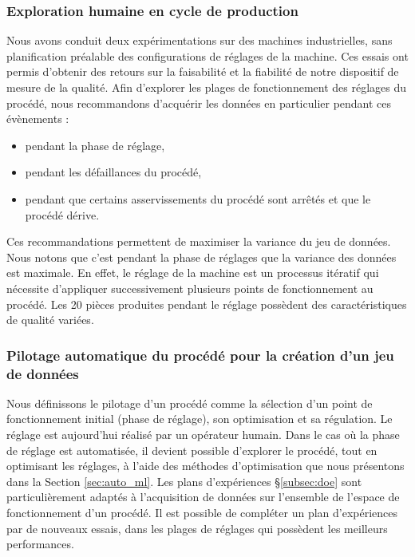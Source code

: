 \subsubsection{Exploration humaine en cycle de production}
Nous avons conduit deux expérimentations sur des machines industrielles, sans planification préalable des configurations de réglages de la machine.
Ces essais ont permis d'obtenir des retours sur la faisabilité et la fiabilité de notre dispositif de mesure de la qualité.
Afin d'explorer les plages de fonctionnement des réglages du procédé, nous recommandons d'acquérir les données en particulier pendant ces évènements :
\begin{itemize}
\item pendant la phase de réglage,
\item pendant les défaillances du procédé,
\item pendant que certains asservissements du procédé sont arrêtés et que le procédé dérive.
\end{itemize}
Ces recommandations permettent de maximiser la variance du jeu de données.
Nous notons que c'est pendant la phase de réglages que la variance des données est maximale.
En effet, le réglage de la machine est un processus itératif qui nécessite d'appliquer successivement plusieurs points de fonctionnement au procédé.
Les 20 pièces produites pendant le réglage possèdent des caractéristiques de qualité variées.

\subsubsection{Pilotage automatique du procédé pour la création d'un jeu de données}
Nous définissons le pilotage d'un procédé comme la sélection d'un point de fonctionnement initial (phase de réglage), son optimisation et sa régulation.
Le réglage est aujourd'hui réalisé par un opérateur humain.
Dans le cas où la phase de réglage est automatisée, il devient possible d'explorer le procédé, tout en optimisant les réglages, à l'aide des méthodes d'optimisation que nous présentons dans la Section \ref{sec:auto_ml}.
Les plans d'expériences §\ref{subsec:doe} sont particulièrement adaptés à l'acquisition de données sur l'ensemble de l'espace de fonctionnement d'un procédé.
Il est possible de compléter un plan d'expériences par de nouveaux essais, dans les plages de réglages qui possèdent les meilleurs performances.


\bigskip

